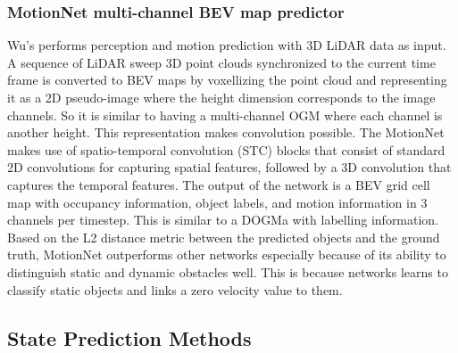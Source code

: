 \subsubsection{MotionNet multi-channel BEV map predictor}
Wu's \cite{wu2020motionnet} performs perception and motion prediction with 3D LiDAR data as input. A sequence of LiDAR sweep 3D point clouds synchronized to the current time frame is converted to BEV maps by voxellizing the point cloud and representing it as a 2D pseudo-image where the height dimension corresponds to the image channels. So it is similar to having a multi-channel OGM where each channel is another height. This representation makes convolution possible. The MotionNet makes use of spatio-temporal convolution (STC) blocks that consist of standard 2D convolutions for capturing spatial features, followed by a 3D convolution that captures the temporal features. The output of the network is a BEV grid cell map with occupancy information, object labels, and motion information in 3 channels per timestep. This is similar to a DOGMa with labelling information. Based on the L2 distance metric between the predicted objects and the ground truth, MotionNet outperforms other networks especially because of its ability to distinguish static and dynamic obstacles well. This is because networks learns to classify static objects and links a zero velocity value to them.



\subsection{State Prediction Methods} \label{sec:state_methods}

